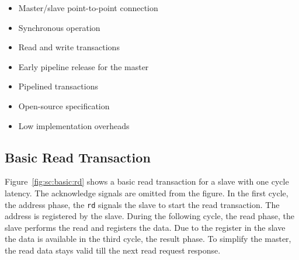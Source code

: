 \documentclass[a4paper,12pt]{scrartcl}
\newcommand{\sign}[1]{{\texttt{#1}}}
\begin{document}
\begin{itemize}
    \item Master/slave point-to-point connection
    \item Synchronous operation
    \item Read and write transactions
    \item Early pipeline release for the master
    \item Pipelined transactions
    \item Open-source specification
    \item Low implementation overheads
\end{itemize}

\subsection{Basic Read Transaction}

Figure~\ref{fig:sc:basic:rd} shows a basic read transaction for a
slave with one cycle latency. The acknowledge signals are omitted
from the figure. In the first cycle, the address phase, the
\sign{rd} signals the slave to start the read transaction. The
address is registered by the slave. During the following cycle, the
read phase, the slave performs the read and registers the data. Due
to the register in the slave the data is available in the third
cycle, the result phase. To simplify the master, the read data stays
valid till the next read request response.
\end{document}
